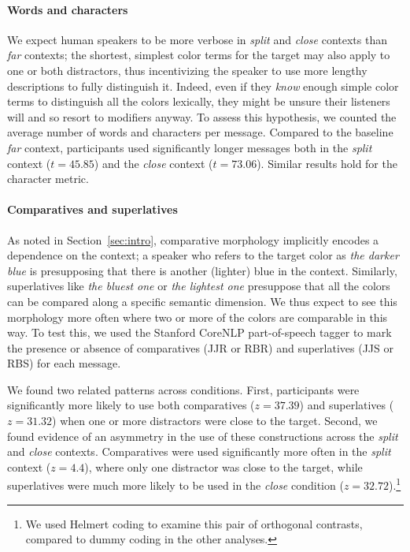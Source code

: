 \documentclass[11pt,letterpaper]{article}
\newcommand{\word}{\textit}
\renewcommand{\|}{\mid}
\newcommand{\secref}[1]{Section~\ref{#1}}
\newcommand{\cond}{\emph}
\begin{document}
\paragraph{Words and characters}
We expect human speakers to be more verbose in \cond{split} and \cond{close}
contexts than \cond{far} contexts; the shortest, simplest color terms for the target
may also apply to one or both distractors, thus incentivizing the speaker to use more
lengthy descriptions to fully distinguish it. Indeed, even if they \emph{know}
enough simple color terms to distinguish all the colors
lexically, they might be unsure their listeners will and so
resort to modifiers anyway. To assess this hypothesis,
we counted the average number of words and characters per message.
Compared to the baseline \cond{far} context, participants used significantly longer messages both in the \cond{split} context ($t =  45.85$) and the \cond{close} context ($t = 73.06$). Similar results hold for the character metric.

\paragraph{Comparatives and superlatives}
As noted in \secref{sec:intro}, comparative morphology implicitly
encodes a dependence on the context; a speaker who refers to the
target color as \word{the darker blue} is presupposing that there is
another (lighter) blue in the context. Similarly, superlatives like
\word{the bluest one} or \word{the lightest one} presuppose that all
the colors can be compared along a specific semantic dimension. We
thus expect to see this morphology more often where two or more of the
colors are comparable in this way. To test this, we used the Stanford
CoreNLP part-of-speech tagger \cite{Toutanova2003} to mark the presence or absence of comparatives (JJR or RBR) and superlatives (JJS or RBS) for each message.

We found two related patterns across conditions. First, participants were significantly
more likely to use both comparatives ($z = 37.39$) and superlatives ($z = 31.32$)
when one or more distractors were close to the target. Second, we found evidence of
an asymmetry in  the use of these constructions across the \cond{split} and
\cond{close} contexts. Comparatives were used significantly more often in the
\cond{split} context ($z = 4.4$), where only one distractor was close to the target,
while superlatives were much more likely to be used in the \cond{close} condition
($z = 32.72$).\footnote{We used Helmert coding to examine this pair of orthogonal
contrasts, compared to dummy coding in the other analyses.}
\end{document}
